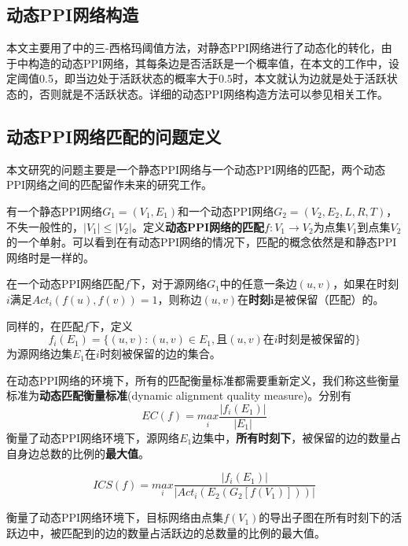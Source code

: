 \subsection{动态PPI网络构造}
本文主要用了\cite{zhang2016method}中的三-西格玛阈值方法，对静态PPI网络进行了动态化的转化，由于\cite{zhang2016method}中构造的动态PPI网络，其每条边是否活跃是一个概率值，在本文的工作中，设定阈值0.5，即当边处于活跃状态的概率大于$0.5$时，本文就认为边就是处于活跃状态的，否则就是不活跃状态。详细的动态PPI网络构造方法可以参见相关工作。

\subsection{动态PPI网络匹配的问题定义}
本文研究的问题主要是一个静态PPI网络与一个动态PPI网络的匹配，两个动态PPI网络之间的匹配留作未来的研究工作。

有一个静态PPI网络$G_1=(V_1,E_1)$和一个动态PPI网络$G_2=(V_2,E_2,L,R,T)$，不失一般性的，$|V_1|\leq |V_2|$。定义\textbf{动态PPI网络的匹配}$f:V_1\rightarrow V_2$为点集$V_1$到点集$V_2$的一个单射。可以看到在有动态PPI网络的情况下，匹配的概念依然是和静态PPI网络时是一样的。

在一个动态PPI网络匹配$f$下，对于源网络$G_1$中的任意一条边$(u,v)$，如果在时刻$i$满足$Act_i(f(u),f(v))=1$，则称边$(u,v)$在\textbf{时刻}$\mathbf{i}$是被保留（匹配）的。

同样的，在匹配$f$下，定义$$f_i(E_1)=\{(u,v):(u,v)\in E_1,\text{且}(u,v)\text{在$i$时刻是被保留的}\}$$为源网络边集$E_1$在$i$时刻被保留的边的集合。

在动态PPI网络的环境下，所有的匹配衡量标准都需要重新定义，我们称这些衡量标准为\textbf{动态匹配衡量标准}(dynamic alignment quality measure)。分别有
\begin{equation}\label{myworkecdefine}
    EC(f)=\underset{i}{max}\frac{\left | f_i(E_1) \right |}{\left | E_1 \right |}
\end{equation}
衡量了动态PPI网络环境下，源网络$E_1$边集中，\textbf{所有时刻下}，被保留的边的数量占自身边总数的比例的\textbf{最大值}。

\begin{equation}\label{myworkicsdefine}
    ICS(f)=\underset{i}{max}\frac{\left | f_i(E_1) \right |}{\left |Act_i(E_2(G_2[f(V_1)]))\right |}
\end{equation}

衡量了动态PPI网络环境下，目标网络由点集$f(V_1)$的导出子图在所有时刻下的活跃边中，被匹配到的边的数量占活跃边的总数量的比例的最大值。

